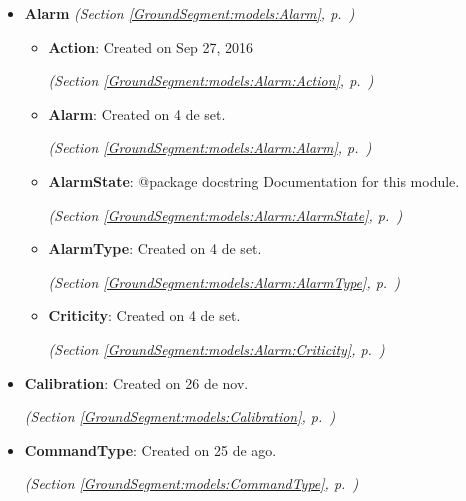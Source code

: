 \begin{itemize}
\setlength{\parskip}{0ex}
\item \textbf{Alarm}
  \textit{(Section \ref{GroundSegment:models:Alarm}, p.~\pageref{GroundSegment:models:Alarm})}

  \begin{itemize}
\setlength{\parskip}{0ex}
    \item \textbf{Action}: Created on Sep 27, 2016



  \textit{(Section \ref{GroundSegment:models:Alarm:Action}, p.~\pageref{GroundSegment:models:Alarm:Action})}

    \item \textbf{Alarm}: Created on 4 de set.



  \textit{(Section \ref{GroundSegment:models:Alarm:Alarm}, p.~\pageref{GroundSegment:models:Alarm:Alarm})}

    \item \textbf{AlarmState}: @package docstring Documentation for this module.



  \textit{(Section \ref{GroundSegment:models:Alarm:AlarmState}, p.~\pageref{GroundSegment:models:Alarm:AlarmState})}

    \item \textbf{AlarmType}: Created on 4 de set.



  \textit{(Section \ref{GroundSegment:models:Alarm:AlarmType}, p.~\pageref{GroundSegment:models:Alarm:AlarmType})}

    \item \textbf{Criticity}: Created on 4 de set.



  \textit{(Section \ref{GroundSegment:models:Alarm:Criticity}, p.~\pageref{GroundSegment:models:Alarm:Criticity})}

  \end{itemize}
\item \textbf{Calibration}: Created on 26 de nov.



  \textit{(Section \ref{GroundSegment:models:Calibration}, p.~\pageref{GroundSegment:models:Calibration})}

\item \textbf{CommandType}: Created on 25 de ago.



  \textit{(Section \ref{GroundSegment:models:CommandType}, p.~\pageref{GroundSegment:models:CommandType})}


\end{itemize}
